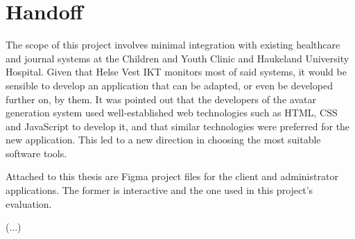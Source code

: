 














\section{Handoff}

The scope of this project involves minimal integration with existing healthcare and journal systems at the Children and Youth Clinic and Haukeland University Hospital. Given that Helse Vest IKT monitors most of said systems, it would be sensible to develop an application that can be adapted, or even be developed further on, by them. It was pointed out that the developers of the avatar generation system used well-established web technologies such as HTML, CSS and JavaScript to develop it, and that similar technologies were preferred for the new application. This led to a new direction in choosing the most suitable software tools.

Attached to this thesis are Figma project files for the client and administrator applications. The former is interactive and the one used in this project's evaluation. %

(...)
